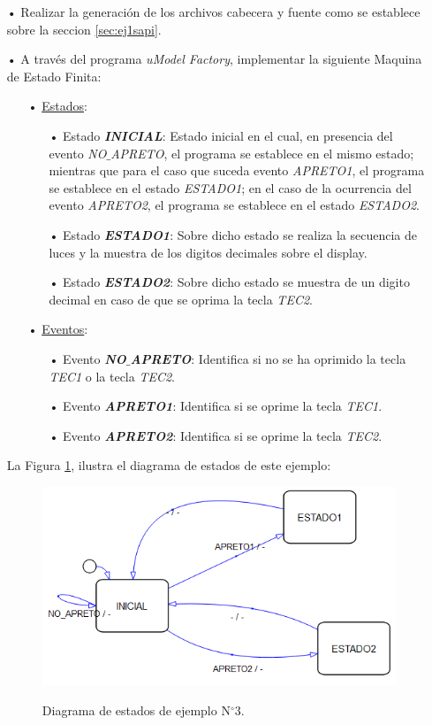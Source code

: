 \documentclass[12pt,letterpaper]{article}
\begin{document}
\begin{enumerate}
\item[•]Realizar la generación de los archivos cabecera y fuente como se establece sobre la seccion \ref{sec:ej1sapi}.

\item[•] A través del programa \textit{uModel Factory}, implementar la siguiente Maquina de Estado Finita:

\begin{enumerate}
\item[•]\underline{Estados}:
\begin{enumerate}
\item[•]Estado \textit{\textbf{INICIAL}}: Estado inicial en el cual, en presencia del evento \textit{NO$\_$APRETO}, el programa se establece en el mismo estado; mientras que para el caso que suceda evento \textit{APRETO1}, el programa se establece en el estado \textit{ESTADO1}; en el caso de la ocurrencia del evento \textit{APRETO2}, el programa se establece en el estado \textit{ESTADO2}. 
\item[•]Estado \textit{\textbf{ESTADO1}}: Sobre dicho estado se realiza la secuencia de luces y la muestra de los digitos decimales sobre el display.
\item[•]Estado \textit{\textbf{ESTADO2}}: Sobre dicho estado se muestra de un digito decimal en caso de que se oprima la tecla \textit{TEC2}.
\end{enumerate}
\item[•]\underline{Eventos}:
\begin{enumerate}
\item[•]Evento \textit{\textbf{NO$\_$APRETO}}: Identifica si no se ha oprimido la tecla \textit{TEC1} o la tecla \textit{TEC2}.
\item[•]Evento \textit{\textbf{APRETO1}}: Identifica si se oprime la tecla \textit{TEC1}.
\item[•]Evento \textit{\textbf{APRETO2}}: Identifica si se oprime la tecla \textit{TEC2}.
\end{enumerate}
\end{enumerate}
La Figura \ref{Fig27}, ilustra el diagrama de estados de este ejemplo:


\begin{figure}[H]
\centering
\includegraphics[width=6 cm]{figuras/f9.png}\\
\caption{Diagrama de estados de ejemplo N$^{\circ}$3.}
\label{Fig27}
\end{figure}


\end{enumerate}
\end{document}
